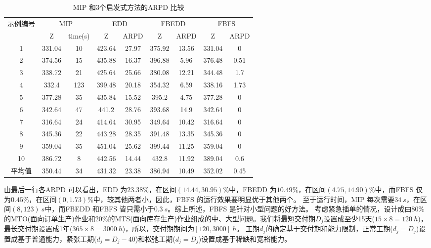 \begin{table}[h]
  \centering\xiaowu
  \caption{MIP 和3个启发式方法的ARPD 比较}
    \begin{tabular}{ccccccccc}
    \toprule
    \multirow{2}[4]{*}{示例编号} & \multicolumn{2}{c}{MIP} & \multicolumn{2}{c}{EDD} & \multicolumn{2}{c}{FBEDD} & \multicolumn{2}{c}{FBFS} \\
   \cline{2-9}
          & Z     & time(s) & Z     & ARPD  & Z     & ARPD  & Z     & ARPD \\
      \midrule
    1     & 331.04 & 10    & 423.64 & 27.97 & 375.92 & 13.56 & 331.04 & 0 \\
    2     & 374.56 & 15    & 435.88 & 16.37 & 396.88 & 5.96  & 376.48 & 0.51 \\
    3     & 338.72 & 21    & 425.64 & 25.66 & 380.08 & 12.21 & 344.48 & 1.7 \\
    4     & 332.4 & 123   & 399.48 & 20.18 & 354.32 & 6.59  & 338.16 & 1.73 \\
    5     & 377.28 & 35    & 435.84 & 15.52 & 395.2 & 4.75  & 377.28 & 0 \\
    6     & 342.64 & 47    & 441.2 & 28.76 & 393.68 & 14.9  & 342.64 & 0 \\
    7     & 316.64 & 24    & 414.64 & 30.95 & 349.64 & 10.42 & 316.64 & 0 \\
    8     & 345.36 & 22    & 443.28 & 28.35 & 391.48 & 13.35 & 345.36 & 0 \\
    9     & 359.04 & 35    & 451.04 & 25.62 & 399.44 & 11.25 & 359.04 & 0 \\
    10    & 386.72 & 8     & 442.56 & 14.44 & 432.8 & 11.92 & 389.04 & 0.6 \\[3pt]
    平均值   & 350.44 & 34    & 431.32 & 23.38 & 386.94 & 10.49 & 352.02 & 0.45 \\
    \bottomrule
    \end{tabular}
  \label{tab:comparisonforarpd}
\end{table}
由最后一行各ARPD 可以看出，EDD 为$23.38\%$，在区间$(14.44,30.95)\%$中，FBEDD 为$10.49\%$，在区间$(4.75,14.90)\%$中，而FBFS 仅为$0.45\%$，在区间$(0,1.73)\%$中，较其他两者小，因此，FBFS 的运行效果要明显优于其他两个。
至于运行时间，MIP 每次需要$34\ s$，在区间$(8,123)\ s$中，而FBEDD 和FBFS 皆只需小于$0.3\ s$。综上所述，FBFS 是针对小型问题的好方法。
考虑紧急插单的情况，设计成由$80\%$的MTO(面向订单生产)作业和$20\%$的MTS(面向库存生产)作业组成的中、大型问题。我们将最短交付期$D_j$设置成至少15天($15\times 8 = 120\ h$)，最长交付期设置成1年($365\times 8 = 3000\ h$)，所以，交付期期间为$[120,3000]\ h$。
工期$d_j$的确定基于交付期和能力限制，正常工期($d_j = D_j$)设置成基于普通能力，紧张工期($d_j = D_j - 40$)和松弛工期($d_j = D_j$)设置成基于稀缺和宽裕能力。

